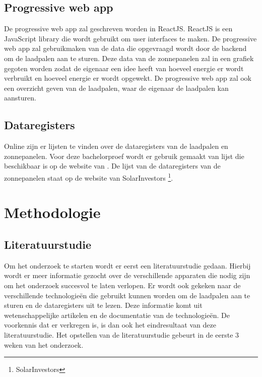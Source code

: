 \subsection{Progressive web app}%
\label{sub:progressive_web_app}
De progressive web app zal geschreven worden in ReactJS. ReactJS is een JavaScript library die wordt gebruikt om user interfaces te maken. De progressive web app zal gebruikmaken van de data die opgevraagd wordt door de backend om de laadpalen aan te sturen. Deze data van de zonnepanelen zal in een grafiek gegoten worden zodat de eigenaar een idee heeft van hoeveel energie er wordt verbruikt en hoeveel energie er wordt opgewekt. De progressive web app zal ook een overzicht geven van de laadpalen, waar de eigenaar de laadpalen kan aansturen.

\subsection{Dataregisters}%
\label{sub:dataregisters}
Online zijn er lijsten te vinden over de dataregisters van de laadpalen en zonnepanelen. Voor deze bachelorproef wordt er gebruik gemaakt van lijst die beschikbaar is op de website van \textcite{Alfen2020}. De lijst van de dataregisters van de zonnepanelen staat op de website van SolarInvestors \footnote{SolarInvestors}.


\section{Methodologie}%
\label{sec:methodologie}

\subsection{Literatuurstudie}%
\label{sub:literatuurstudie_methodologie}
Om het onderzoek te starten wordt er eerst een literatuurstudie gedaan. Hierbij wordt er meer informatie gezocht over de verschillende apparaten die nodig zijn om het onderzoek succesvol te laten verlopen. Er wordt ook gekeken naar de verschillende technologieën die gebruikt kunnen worden om de laadpalen aan te sturen en de dataregisters uit te lezen. Deze informatie komt uit wetenschappelijke artikelen en de documentatie van de technologieën. De voorkennis dat er verkregen is, is dan ook het eindresultaat van deze literatuurstudie. Het opstellen van de literatuurstudie gebeurt in de eerste 3 weken van het onderzoek.

